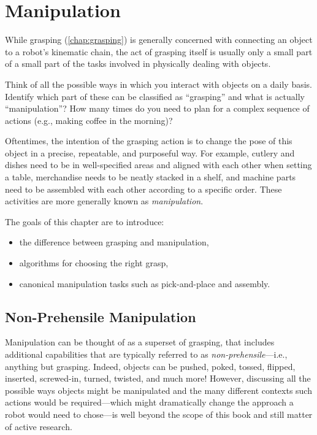 \chapter{Manipulation}\label{chap:manipulation}

While grasping (\cref{chap:grasping}) is generally concerned with connecting an object to a robot's kinematic chain, the act of grasping itself is usually only a small part of a small part of the tasks involved in physically dealing with objects.

\begin{mdframed}
Think of all the possible ways in which you interact with objects on a daily basis. Identify which part of these can be classified as ``grasping'' and what is actually ``manipulation''? How many times do you need to plan for a complex sequence of actions (e.g., making coffee in the morning)?
\end{mdframed}

Oftentimes, the intention of the grasping action is to change the pose of this object in a precise, repeatable, and purposeful way.
For example, cutlery and dishes need to be in well-specified areas and aligned with each other when setting a table, merchandise needs to be neatly stacked in a shelf, and machine parts need to be assembled with each other according to a specific order.
These activities are more generally known as \textsl{manipulation}.


The goals of this chapter are to introduce:

\begin{itemize}
\item the difference between grasping and manipulation,
\item algorithms for choosing the right grasp,
\item canonical manipulation tasks such as pick-and-place and assembly.
\end{itemize}

\section{Non-Prehensile Manipulation}
Manipulation can be thought of as a superset of grasping, that includes additional capabilities that are typically referred to as \textsl{non-prehensile}---i.e., anything but grasping. Indeed, objects can be pushed, poked, tossed, flipped, inserted, screwed-in, turned, twisted, and much more!
However, discussing all the possible ways objects might be manipulated and the many different contexts such actions would be required---which might dramatically change the approach a robot would need to chose---is well beyond the scope of this book and still matter of active research.

